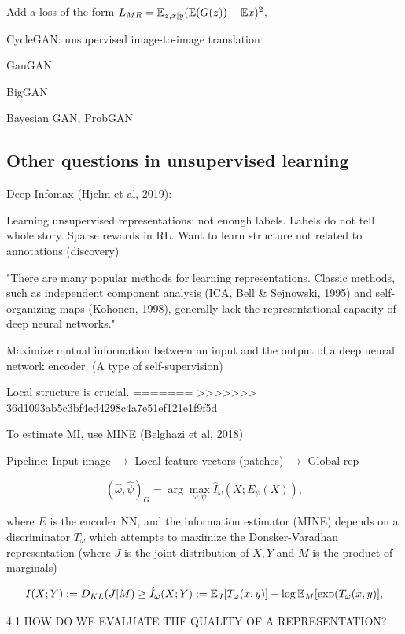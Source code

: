 \documentclass[english]{article}
\begin{document}
Add a loss of the form $L_{MR} = \mathbb{E}_{z,x|y}(\mathbb{E}(G(z)) - \mathbb{E} x)^2$,

\item 

CycleGAN: unsupervised image-to-image translation

GauGAN

BigGAN
 
Bayesian GAN, ProbGAN

\eenum 

\subsection{Other questions in unsupervised learning}

\benum 
\item Deep Infomax (Hjelm et al, 2019): 

Learning unsupervised representations: not enough labels. Labels do not tell whole story. Sparse rewards in RL. Want to learn structure not related to annotations (discovery)

"There are many popular methods for learning representations. Classic methods, such as independent
component analysis (ICA, Bell \& Sejnowski, 1995) and self-organizing maps (Kohonen, 1998),
generally lack the representational capacity of deep neural networks."



Maximize mutual information between an input and the output of a deep neural network encoder. (A type of self-supervision)

Local structure is crucial. 
=======
>>>>>>> 36d1093ab5c3bf4ed4298c4a7e51ef121e1f9f5d

To estimate MI, use MINE (Belghazi et al, 2018)

Pipeline: Input image $\to$ Local feature vectors (patches) $\to$ Global rep

$$(\hat \omega,\hat \psi)_G 
= \arg\max_{\omega,\psi}
\hat I_{\omega}(X;E_\psi(X)),$$ 

where $E$ is the encoder NN, and the information estimator (MINE) depends on a discriminator $T_\omega$ which attempts to maximize the Donsker-Varadhan representation (where $J$ is the joint distribution of $X,Y$ and $M$ is the product of marginals)

$$I(X;Y) := D_{KL}(J|M) \ge \hat I_\omega(X;Y) 
:= \mathbb{E}_J[T_\omega (x,y)] - \log \mathbb{E}_M [\exp(T_\omega(x,y)],$$ 

4.1 HOW DO WE EVALUATE THE QUALITY OF A REPRESENTATION?
\end{document}
